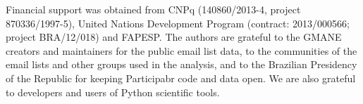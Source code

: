 \documentclass[%
 aip,
 jmp,%
 amsmath,amssymb,
 reprint,%
]{revtex4-1}
\begin{document}
%
\begin{acknowledgments}
	Financial support was obtained from CNPq (140860/2013-4,
	project 870336/1997-5), United Nations Development Program (contract: 2013/000566; project BRA/12/018) and FAPESP. 
	The authors are grateful to the GMANE creators and maintainers for the public email list data, to the communities of the email lists and other groups used in the analysis, and to the Brazilian Presidency of the Republic for keeping Participabr code and data open.
	We are also grateful to developers and users of Python scientific tools.
\end{acknowledgments}


%

%
%
\appendix
%
\end{document}
